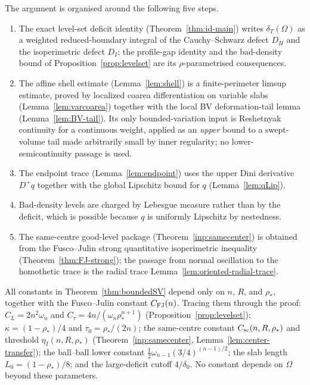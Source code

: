 \documentclass[11pt]{amsart}
\theoremstyle{definition}
\newcommand{\Om}{\Omega}
\newcommand{\dT}{\delta_T}
\newcommand{\rstar}{\rho_*}
\begin{document}
The argument is organised around the following five steps.
\begin{enumerate}[leftmargin=2em]
\item The exact level-set deficit identity (Theorem~\ref{thm:id-main}) writes
\(\dT(\Om)\) as a weighted reduced-boundary integral of the Cauchy--Schwarz
defect \(D_H\) and the isoperimetric defect \(D_I\); the profile-gap identity
and the bad-density bound of Proposition~\ref{prop:levelset} are its
\(\rho\)-parametrised consequences.
\item The affine shell estimate (Lemma~\ref{lem:shell}) is a finite-perimeter
limsup estimate, proved by localized coarea differentiation on variable slabs
(Lemma~\ref{lem:varcoarea}) together with the local BV deformation-tail lemma
(Lemma~\ref{lem:BV-tail}).  Its only bounded-variation input is Reshetnyak
continuity for a continuous weight, applied as an \emph{upper} bound to a
swept-volume tail made arbitrarily small by inner regularity; no
lower-semicontinuity passage is used.
\item The endpoint trace (Lemma~\ref{lem:endpoint}) uses the upper Dini
derivative \(D^+q\) together with the global Lipschitz bound for \(q\)
(Lemma~\ref{lem:qLip}).
\item Bad-density levels are charged by Lebesgue measure rather than by the
deficit, which is possible because \(q\) is uniformly Lipschitz by nestedness.
\item The same-centre good-level package (Theorem~\ref{inp:samecenter}) is
obtained from the Fusco--Julin strong quantitative isoperimetric inequality
(Theorem~\ref{thm:FJ-strong}); the passage from normal oscillation to the
homothetic trace is the radial trace Lemma~\ref{lem:oriented-radial-trace}.
\end{enumerate}

\noindent
All constants in Theorem~\ref{thm:boundedSV} depend only on \(n\), \(R\), and
\(\rstar\), together with the Fusco--Julin constant \(C_{\rm FJ}(n)\).  Tracing
them through the proof: \(C_L=2n^2\omega_n\) and
\(C_\tau=4n/(\omega_n\rstar^{n+1})\) (Proposition~\ref{prop:levelset});
\(\kappa=(1-\rstar)/4\) and \(\tau_0=\rstar/(2n)\); the same-centre constant
\(C_{\rm sc}(n,R,\rstar)\) and threshold \(\eta_I(n,R,\rstar)\)
(Theorem~\ref{inp:samecenter}, Lemma~\ref{lem:center-transfer}); the ball--ball
lower constant \(\tfrac12\omega_{n-1}(3/4)^{(n-1)/2}\); the slab length
\(L_0=(1-\rstar)/8\); and the large-deficit cutoff \(4/\delta_0\).  No constant
depends on \(\Om\) beyond these parameters.
\end{document}
